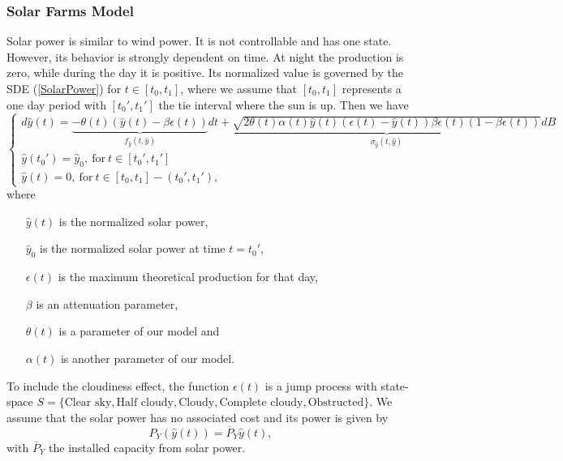 \subsubsection{Solar Farms Model}

Solar power is similar to wind power. It is not controllable and has one state. However, its behavior is strongly dependent on time. At night the production is zero, while during the day it is positive. Its normalized value is governed by the SDE (\ref{SolarPower}) for $t\in[t_0,t_1]$, where we assume that $[t_0,t_1]$ represents a one day period with $[t_0',t_1']$ the tie interval where the sun is up. Then we have
\begin{equation}
\begin{cases}
d\hat{y}(t)=\underbrace{-\theta(t)(\hat{y}(t)-\beta\epsilon(t))}_{f_{\hat{y}}(t,\hat{y})}dt+\underbrace{\sqrt{2\theta(t)\alpha(t)\hat{y}(t)(\epsilon(t)-\hat{y}(t))\beta\epsilon(t)(1-\beta\epsilon(t))}}_{\sigma_{\hat{y}}(t,\hat{y})}dB\\
\hat{y}(t_0')=\hat{y}_0,\ \text{for}\ t\in[t_0',t_1']\\
\hat{y}(t)=0,\ \text{for}\ t\in[t_0,t_1]-(t_0',t_1'),
\label{SolarPower}
\end{cases}
\end{equation}
where
\begin{enumerate}

\item[$\hat{y}(t)$] is the normalized solar power,

\item[$\hat{y}_0$] is the normalized solar power at time $t=t_0'$,

\item[$\epsilon(t)$] is the maximum theoretical production for that day,

\item[$\beta$] is an attenuation parameter,

\item[$\theta(t)$] is a parameter of our model and

\item[$\alpha(t)$] is another parameter of our model.

\end{enumerate}
To include the cloudiness effect, the function $\epsilon(t)$ is a jump process with state-space $S=\{\text{Clear sky},\text{Half cloudy},\text{Cloudy},\text{Complete cloudy},\text{Obstructed}\}$. We assume that the solar power has no associated cost and its power is given by
\begin{equation*}
P_Y(\hat{y}(t))=\overline{P}_Y\hat{y}(t),
\end{equation*}
with $\overline{P}_Y$ the installed capacity from solar power.

